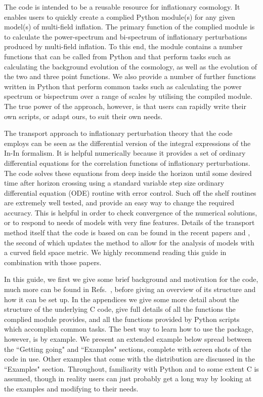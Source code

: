 \documentclass[10pt,
amsmath,amssymb,
aps,prd,nofootinbib,eqsecnum,a4paper]{revtex4}
\newcommand{\CC}{C\nolinebreak\hspace{-.05em}\raisebox{.4ex}{\tiny\bf +}\nolinebreak\hspace{-.10em}\raisebox{.4ex}{\tiny\bf +}}
\def\CC{{C\nolinebreak[4]\hspace{-.05em}\raisebox{.4ex}{\tiny\bf ++}}}
\def\S{ }
\begin{document}
The code is intended to be a reusable resource for inflationary cosmology. It enables users to quickly create a 
complied Python module(s) for any given model(s) of multi-field inflation. 
The primary function of the complied module is to calculate the power-spectrum and bi-spectrum of inflationary 
perturbations produced by multi-field inflation. To this end,
the module contains a number 
functions that can be called from Python and that perform tasks such as calculating the background evolution 
of the cosmology, as well as the evolution of the two and three point functions. We also provide a number of further functions written in 
Python that perform common tasks such as calculating the power spectrum or bispectrum over a range of scales by utilising the 
compiled module.
The true power of the approach, however, is that users can rapidly write their own scripts, or adapt ours, to suit their own needs. 

The transport approach to inflationary perturbation theory that the code employs 
can be seen as the differential version of the integral expressions of the In-In formalism. It 
is helpful numerically because it provides a set of ordinary differential equations for the correlation functions  
of inflationary perturbations. The code solves these equations from deep inside the horizon until some desired time 
after horizon crossing using a standard variable step size ordinary differential equation (ODE) 
routine with error control. Such off the shelf 
routines are extremely well tested, and provide
an easy way to change the required accuracy. This is helpful in order to check convergence of the numerical 
solutions, or to respond to needs of models with very fine features. 
Details of the transport method itself that the code is based on can be found in the recent papers \cite{Dias:2016rjq} 
and \cite{xxx2}, the second of which updates the method to allow
for the analysis of models with a curved field space metric. We 
highly recommend reading this guide in combination with those papers.



In this guide, we first we give some brief background and motivation for the code, much more can be found in Refs.~\cite{Dias:2016rjq,xxx2}, 
before giving an overview of its structure and how 
it can be set up. In the appendices we give some more detail about the structure of the underlying \CC \S code,  
give full details of all the functions the complied module provides, and all the functions provided by 
Python scripts which accomplish common tasks. The best way to learn how to use the package, however, is 
by example. We present an extended example below spread between the ``Getting going"  and ``Examples" sections, 
complete with screen shots of the code in use. 
Other examples that come with the distribution are discussed in the ``Examples" section.
Throughout, familiarity with Python and to some extent \CC \S  is assumed, though in reality users 
can just probably get a long way by looking at the examples and modifying to their needs. 
\end{document}

